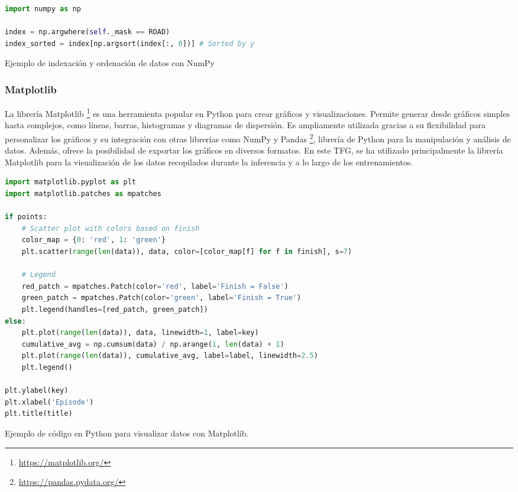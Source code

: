 \begin{code}[h]
\begin{lstlisting}[language=Python]
import numpy as np

index = np.argwhere(self._mask == ROAD)
index_sorted = index[np.argsort(index[:, 0])] # Sorted by y

\end{lstlisting}
\caption[Ejemplo de indexación y ordenación de datos con NumPy]{Ejemplo de indexación y ordenación de datos con NumPy}
\label{cod:numpy}
\end{code}

\subsubsection{Matplotlib}
\label{sec:plot}

La librería Matplotlib \footnote{\url{https://matplotlib.org/}} es una herramienta popular en Python para crear gráficos y visualizaciones. Permite generar desde gráficos simples hasta complejos, como líneas, barras, histogramas y diagramas de dispersión. Es ampliamente utilizada gracias a su flexibilidad para personalizar los gráficos y su integración con otras librerías como NumPy y Pandas \footnote{\url{https://pandas.pydata.org/}}, librería de Python para la manipulación y análisis de datos. Además, ofrece la posibilidad de exportar los gráficos en diversos formatos. En este \ac{TFG}, se ha utilizado principalmente la librería Matplotlib para la visualización de los datos recopilados durante la inferencia y a lo largo de los entrenamientos.

\begin{code}[h]
\begin{lstlisting}[language=Python]
import matplotlib.pyplot as plt
import matplotlib.patches as mpatches

if points:
	# Scatter plot with colors based on finish
	color_map = {0: 'red', 1: 'green'}
	plt.scatter(range(len(data)), data, color=[color_map[f] for f in finish], s=7)
	
	# Legend
	red_patch = mpatches.Patch(color='red', label='Finish = False')
	green_patch = mpatches.Patch(color='green', label='Finish = True')
	plt.legend(handles=[red_patch, green_patch])  
else:
	plt.plot(range(len(data)), data, linewidth=1, label=key)
	cumulative_avg = np.cumsum(data) / np.arange(1, len(data) + 1)
	plt.plot(range(len(data)), cumulative_avg, label=label, linewidth=2.5)
	plt.legend()

plt.ylabel(key)
plt.xlabel('Episode')
plt.title(title)
\end{lstlisting}
\caption[Ejemplo de código en Python para visualizar datos con Matplotlib]{Ejemplo de código en Python para visualizar datos con Matplotlib.}
\label{cod:plot}
\end{code}

